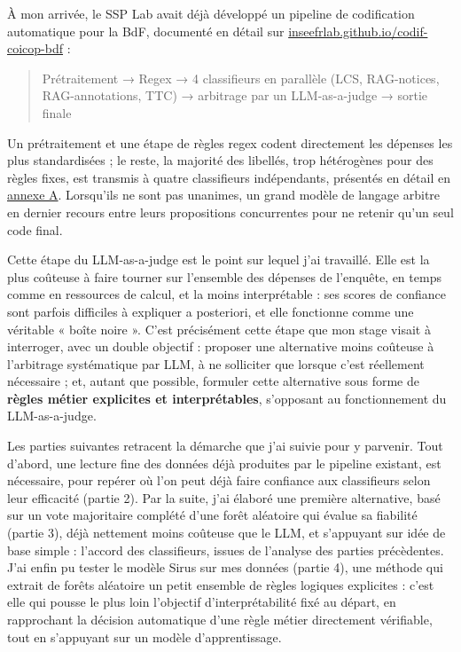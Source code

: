 \documentclass[
]{rapportCS}
\begin{document}
À mon arrivée, le SSP Lab avait déjà développé un pipeline de
codification automatique pour la BdF, documenté en détail sur
\href{https://inseefrlab.github.io/codif-coicop-bdf/}{inseefrlab.github.io/codif-coicop-bdf}
:

\begin{quote}
Prétraitement → Regex → 4 classifieurs en parallèle (LCS, RAG-notices,
RAG-annotations, TTC) → arbitrage par un LLM-as-a-judge → sortie finale
\end{quote}

Un prétraitement et une étape de règles regex codent directement les
dépenses les plus standardisées ; le reste, la majorité des libellés,
trop hétérogènes pour des règles fixes, est transmis à quatre
classifieurs indépendants, présentés en détail en
\hyperref[annexe-pipeline]{annexe A}. Lorsqu'ils ne sont pas unanimes,
un grand modèle de langage arbitre en dernier recours entre leurs
propositions concurrentes pour ne retenir qu'un seul code final.

Cette étape du LLM-as-a-judge est le point sur lequel j'ai travaillé.
Elle est la plus coûteuse à faire tourner sur l'ensemble des dépenses de
l'enquête, en temps comme en ressources de calcul, et la moins
interprétable : ses scores de confiance sont parfois difficiles à
expliquer a posteriori, et elle fonctionne comme une véritable « boîte
noire ». C'est précisément cette étape que mon stage visait à
interroger, avec un double objectif : proposer une alternative moins
coûteuse à l'arbitrage systématique par LLM, à ne solliciter que lorsque
c'est réellement nécessaire ; et, autant que possible, formuler cette
alternative sous forme de \textbf{règles métier explicites et
interprétables}, s'opposant au fonctionnement du LLM-as-a-judge.

Les parties suivantes retracent la démarche que j'ai suivie pour y
parvenir. Tout d'abord, une lecture fine des données déjà produites par
le pipeline existant, est nécessaire, pour repérer où l'on peut déjà
faire confiance aux classifieurs selon leur efficacité (partie 2). Par
la suite, j'ai élaboré une première alternative, basé sur un vote
majoritaire complété d'une forêt aléatoire qui évalue sa fiabilité
(partie 3), déjà nettement moins coûteuse que le LLM, et s'appuyant sur
idée de base simple : l'accord des classifieurs, issues de l'analyse des
parties précèdentes. J'ai enfin pu tester le modèle Sirus sur mes
données (partie 4), une méthode qui extrait de forêts aléatoire un petit
ensemble de règles logiques explicites : c'est elle qui pousse le plus
loin l'objectif d'interprétabilité fixé au départ, en rapprochant la
décision automatique d'une règle métier directement vérifiable, tout en
s'appuyant sur un modèle d'apprentissage.
\end{document}

